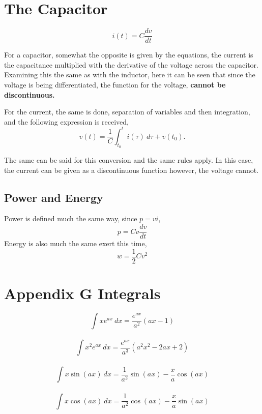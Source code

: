 \documentclass[12pt]{article}
\begin{document}
    \section*{The Capacitor}
    \[
        i(t) = C \frac{dv}{dt}
    \]
    \par For a capacitor, somewhat the opposite is given by the equations, the
    current is the capacitance multiplied with the derivative of the voltage
    across the capacitor. Examining this the same as with the inductor, here it
    can be seen that since the voltage is being differentiated, the function for
    the voltage, \textbf{cannot be discontinuous.}
    \par For the current, the same is
    done, separation of variables and then integration, and the following
    expression is received,
    \[
        v(t) = \frac{1}{C} \int_{t_0}^t i(\tau)\ d\tau + v(t_0)
    .\]
    \par The same can be said for this conversion and the same rules apply. In
    this case, the current can be given as a discontinuous function however, the
    voltage cannot.
    \subsection*{Power and Energy}
    Power is defined much the same way, since $p=vi$,
    \[
        p = Cv \frac{dv}{dt}
    \]
    Energy is also much the same exert this time,
    \[
        w = \frac{1}{2} Cv^2
    \]
    \section*{Appendix G Integrals}
    \;
    \[
        \int xe^{ax}\ dx = \frac{e^{ax}}{a^2} (ax-1)
    \]
    \\
    \[
        \int x^2 e^{ax}\ dx = \frac{e^{ax}}{a^3} (a^2 x^2 - 2ax + 2)
    \]
    \\
    \[
        \int x\sin (ax)\ dx = \frac{1}{a^2} \sin (ax) - \frac{x}{a} \cos (ax)
    \]
    \\
    \[
        \int x\cos (ax)\ dx = \frac{1}{a^2} \cos (ax) - \frac{x}{a} \sin (ax)
    \]
    \newpage
\end{document}
